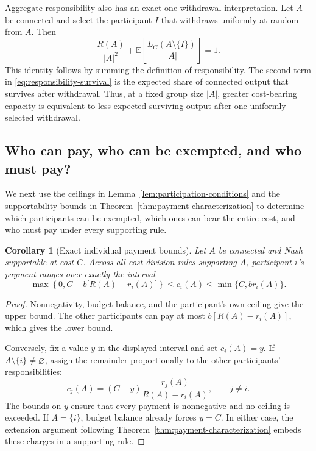 \documentclass[preprint,12pt,authoryear]{elsarticle}
\newcommand{\LCC}{L}
\newtheorem{corollary}{Corollary}
\begin{document}
Aggregate responsibility also has an exact one-withdrawal interpretation. Let
\(A\) be connected and select the participant \(I\) that withdraws uniformly at random from
\(A\). Then
\begin{equation}
 \frac{R(A)}{|A|^2}
 +
 \mathbb E\!\left[
   \frac{\LCC_G(A\setminus\{I\})}{|A|}
 \right]
 =1.
 \label{eq:responsibility-survival}
\end{equation}
This identity follows by summing the definition of responsibility.  The second term in \eqref{eq:responsibility-survival} is the expected share of connected output that survives after withdrawal. Thus, at a fixed group size $|A|$, greater cost-bearing capacity is equivalent
to less expected surviving output after one uniformly selected withdrawal.



\subsection{Who can pay, who can be exempted, and who must pay?}
\label{subsec:incidence}

We next use the ceilings in Lemma~\ref{lem:participation-conditions} and the
supportability bounds in Theorem~\ref{thm:payment-characterization} to determine
which participants can be exempted, which ones can bear the entire cost, and who must pay under every
supporting rule.

\begin{corollary}[Exact individual payment bounds]
\label{cor:individual-payments}
Let \(A\) be connected and Nash supportable at cost \(C\). Across all
cost-division rules supporting \(A\), participant \(i\)'s payment
ranges over exactly the interval
\begin{equation}
 \max\left\{0,C-b\bigl[R(A)-r_i(A)\bigr]\right\}
 \leq c_i(A)\leq
 \min\{C,br_i(A)\}.
 \label{eq:individual-payment-bounds}
\end{equation}
\end{corollary}

\begin{proof}
Nonnegativity, budget balance, and the participant's own ceiling give the
upper bound. The other participants can pay at most
\(b[R(A)-r_i(A)]\), which gives the lower bound.

Conversely, fix a value \(y\) in the displayed interval and set
\(c_i(A)=y\). If \(A\setminus\{i\}\ne\varnothing\), assign the remainder
proportionally to the other participants' responsibilities:
\[
 c_j(A)=(C-y)\frac{r_j(A)}{R(A)-r_i(A)},
 \qquad j\ne i.
\]
The bounds on \(y\) ensure that every payment is nonnegative and no ceiling is
exceeded. If \(A=\{i\}\), budget balance already forces \(y=C\). In either
case, the extension argument following
Theorem~\ref{thm:payment-characterization} embeds these charges in a supporting
rule.
\end{proof}
\end{document}
